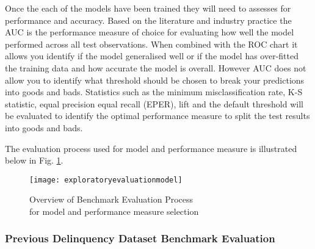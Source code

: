Once the each of the models have been trained they will need to assesses for performance and accuracy. Based on the literature and industry practice the AUC is the performance measure of choice for evaluating how well the model performed across all test observations. When combined with the ROC chart it allows you identify if the model generalised well or if the model has over-fitted the training data and how accurate the model is overall. However AUC does not allow you to identify what threshold should be chosen to break your predictions into goods and bads. Statistics such as the minimum misclassification rate, K-S statistic, equal precision equal recall (EPER), lift and the default threshold will be evaluated to identify the optimal performance measure to split the test results into goods and bads. 

The evaluation process used for model and performance measure is illustrated below in Fig. \ref{fig:exploratoryevaluationmodel}. 

\begin{figure}[H]
	\texttt{[image: exploratoryevaluationmodel]}
	\caption{Overview of Benchmark Evaluation Process\\for model and performance measure selection}
	\label{fig:exploratoryevaluationmodel}
\end{figure}

\subsubsection{Previous Delinquency Dataset Benchmark Evaluation}

